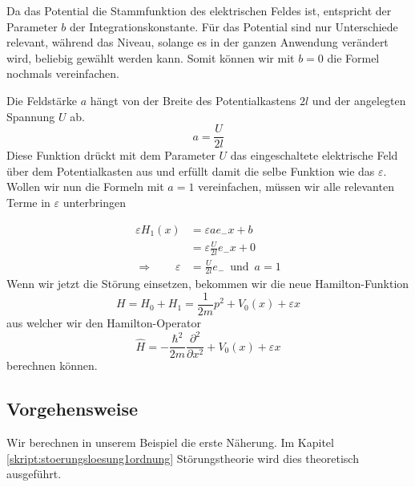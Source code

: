 \begin{refsection}
Da das Potential die Stammfunktion des elektrischen Feldes ist, entspricht der Parameter $b$ der Integrationskonstante.
F\"ur das Potential sind nur Unterschiede relevant, w\"ahrend das Niveau, solange es in der ganzen Anwendung ver\"andert wird,
beliebig gew\"ahlt werden kann. Somit k\"onnen wir mit $b=0$ die Formel nochmals vereinfachen.

Die Feldst\"arke $a$ h\"angt von der Breite des Potentialkastens $2 l$ und der angelegten Spannung $U$ ab.
\[
  a = \frac{ U }{2 l}
\]
Diese Funktion dr\"uckt mit dem Parameter $U$ das eingeschaltete elektrische Feld \"uber dem Potentialkasten aus
und erf\"ullt damit die selbe Funktion wie das $\varepsilon$.
Wollen wir nun die Formeln mit $a=1$ vereinfachen, m\"ussen wir alle relevanten Terme  in $\varepsilon$ unterbringen

\begin{equation}
\begin{aligned}
  \varepsilon H_1(x) &= \varepsilon a e_{-} x +b  \\
                     &= \varepsilon \frac{ U }{2 l} e_{-} x + 0  \\ 
  \Longrightarrow \qquad \varepsilon &= \frac{ U }{2 l} e_{-} \, \text{ und } \, a = 1
\end{aligned}
\end{equation}
Wenn wir jetzt die St\"orung einsetzen, bekommen wir die neue Hamilton-Funktion
\[
  H = H_0 + H_1 
    = \frac1{2m}p^2+V_0(x) + \varepsilon x
\]
aus welcher wir den Hamilton-Operator
\[
  \hat{H} = -\frac{\hbar^2}{2m} \frac{\partial^2}{\partial x^2} + V_0(x) + \varepsilon x
\]
berechnen k\"onnen.

\subsection{Vorgehensweise}
Wir berechnen in unserem Beispiel die erste N\"aherung.
Im Kapitel \ref{skript:stoerungsloesung1ordnung} St\"orungstheorie wird dies 
theoretisch ausgef\"uhrt.


\end{refsection}
